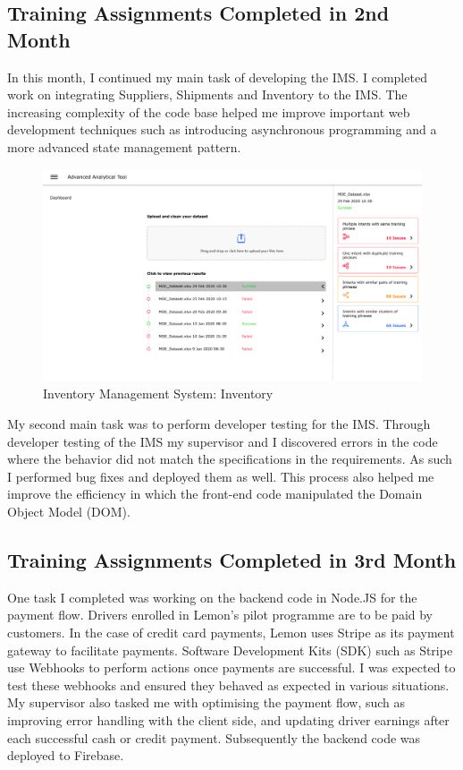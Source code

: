 \subsection{Training Assignments Completed in 2nd Month}
\noindent
In this month, I continued my main task of developing the IMS. I completed work on integrating Suppliers, Shipments and Inventory to the IMS.
The increasing complexity of the code base helped me improve important web development techniques such as introducing asynchronous programming and a more advanced state management pattern.\cite{REF2:1} 

\begin{figure}[h!]
	\begin{center}
		\includegraphics[width=450px]{assets/images/aat-dashboard.png}
		\caption{Inventory Management System: Inventory}
		\label{fig:aat-dashboard}
	\end{center}
\end{figure}

\noindent
My second main task was to perform developer testing for the IMS. Through developer testing of the IMS my supervisor and I discovered errors in the code where the behavior did not match the specifications in the requirements.
As such I performed bug fixes and deployed them as well. This process also helped me improve the efficiency in which the front-end
code manipulated the Domain Object Model (DOM).

\subsection{Training Assignments Completed in 3rd Month}
\noindent
One task I completed was working on the backend code in Node.JS for the payment flow. Drivers enrolled in Lemon's pilot programme are to be paid by customers. In the case of 
credit card payments, Lemon uses Stripe \cite{REF3:1} as its payment gateway to facilitate payments. Software Development Kits (SDK) such as Stripe use Webhooks to perform actions
once payments are successful. I was expected to test these webhooks and ensured they behaved as expected in various situations.
\noindent
My supervisor also tasked me with optimising the payment flow, such as improving error handling with the client side, and
updating driver earnings after each successful cash or credit payment. Subsequently the backend code was deployed to Firebase.

